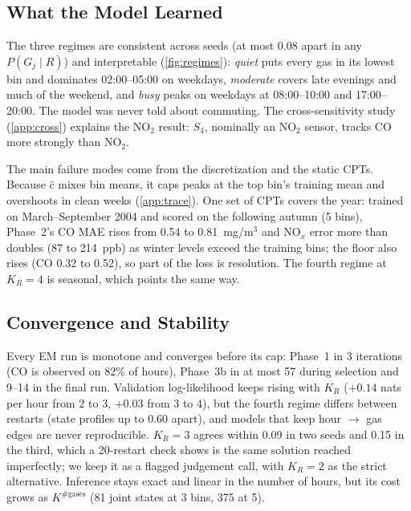 \subsection{What the Model Learned}
\label{sec:learned}
The three regimes are consistent across seeds (at most 0.08 apart in any
$P(G_j \mid R)$) and interpretable (\cref{fig:regimes}): \emph{quiet} puts every
gas in its lowest bin and dominates 02:00--05:00 on weekdays, \emph{moderate}
covers late evenings and much of the weekend, and \emph{busy} peaks on weekdays
at 08:00--10:00 and 17:00--20:00. The model was never told about commuting.
The cross-sensitivity study (\cref{app:cross}) explains the NO$_2$ result:
$S_4$, nominally an NO$_2$ sensor, tracks CO more strongly than NO$_2$.

The main failure modes come from the discretization and the static CPTs.
Because $\hat c$ mixes bin means, it caps peaks at the top bin's training mean
and overshoots in clean weeks (\cref{app:trace}). One set of CPTs covers the
year: trained on March--September 2004 and scored on the following autumn
(5 bins), Phase~2's CO MAE rises from 0.54 to 0.81~mg/m$^3$ and NO$_x$ error
more than doubles (87 to 214~ppb) as winter levels exceed the training bins;
the floor also rises (CO 0.32 to 0.52), so part of the loss is resolution. The fourth regime at $K_R = 4$ is seasonal,
which points the same way.

\subsection{Convergence and Stability}
\label{sec:stability}
Every EM run is monotone and converges before its cap: Phase~1 in 3
iterations (CO is observed on 82\% of hours), Phase~3b in at most 57 during
selection and 9--14 in the final run. Validation log-likelihood keeps rising
with $K_R$ ($+0.14$ nats per hour from 2 to 3, $+0.03$ from 3 to 4), but the
fourth regime differs between restarts (state profiles up to 0.60 apart), and
models that keep hour $\to$ gas edges are never reproducible. $K_R = 3$ agrees
within 0.09 in two seeds and 0.15 in the third, which a 20-restart check shows
is the same solution reached imperfectly; we keep it as a flagged judgement
call, with $K_R = 2$ as the strict alternative. Inference stays exact and
linear in the number of hours, but its cost grows as $K^{\#\text{gases}}$
(81 joint states at 3 bins, 375 at 5).

